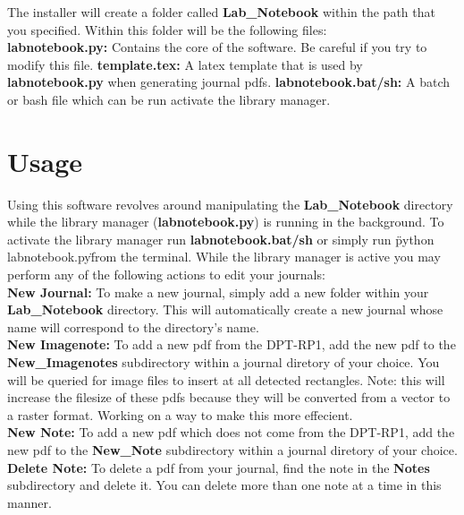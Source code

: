 \documentclass{article}
\begin{document}
The installer will create a folder called \textbf{Lab\_Notebook} within the path that you specified. Within this folder will be the following files:\\

\textbf{labnotebook.py:} Contains the core of the software. Be careful if you try to modify this file.
\textbf{template.tex:} A latex template that is used by \textbf{labnotebook.py} when generating journal pdfs.
\textbf{labnotebook.bat/sh:} A batch or bash file which can be run activate the library manager.

\section{Usage}

Using this software revolves around manipulating the \textbf{Lab\_Notebook} directory while the library manager (\textbf{labnotebook.py}) is running in the background. To activate the library manager run \textbf{labnotebook.bat/sh} or simply run \"python labnotebook.py\" from the terminal. While the library manager is active you may perform any of the following actions to edit your journals:\\

\textbf{New Journal:} To make a new journal, simply add a new folder within your \textbf{Lab\_Notebook} directory. This will automatically create a new journal whose name will correspond to the directory's name.\\

\textbf{New Imagenote:} To add a new pdf from the DPT-RP1, add the new pdf to the \textbf{New\_Imagenotes} subdirectory within a journal diretory of your choice. You will be queried for image files to insert at all detected rectangles. Note: this will increase the filesize of these pdfs because they will be converted from a vector to a raster format. Working on a way to make this more effecient.\\

\textbf{New Note:} To add a new pdf which does not come from the DPT-RP1, add the new pdf to the \textbf{New\_Note} subdirectory within a journal diretory of your choice. \\

\textbf{Delete Note:} To delete a pdf from your journal, find the note in the \textbf{Notes} subdirectory and delete it. You can delete more than one note at a time in this manner.
\end{document}
